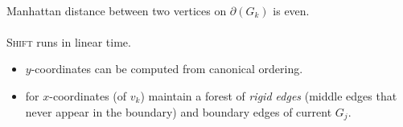 \documentclass[10pt,twocolumn]{article}
\begin{document}
\paragraph{} Manhattan distance between two vertices on
$\partial(G_k)$ is even. 

\paragraph{} \textsc{Shift} runs in linear time.
\begin{itemize}
\item $y$-coordinates can be computed from canonical ordering.
\item for $x$-coordinates (of $v_k$) maintain a forest of \textit{rigid edges}
  (middle edges that never appear in the boundary) %
   and boundary
  edges of current $G_j$.
\end{itemize}
\end{document}
